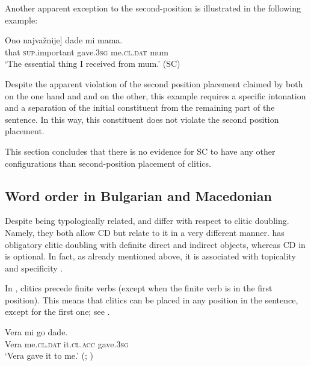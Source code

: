 \documentclass[output=paper,
colorlinks,
citecolor=brown,
newtxmath
]{langscibook}
\begin{document}
Another apparent exception to the second-position is illustrated in the following example:


\ea\label{ex:zivojinovic:23}
\gll\minsp{[} Ono najvažnije]    dade     mi        mama.       \\
    {} that \textsc{sup}.important gave.\textsc{3sg} me.\textsc{cl.dat} mum \\
\glt `The essential thing I received from mum.'
\hfill (SC)
\z

\noindent Despite the apparent violation of the second position placement claimed by both \citet{Franks.King2000} on the one hand and \citet{Boskovic2001} and \citet{Radanovic-Kocic1988} on the other, this example requires a specific intonation and a separation of the initial constituent from the remaining part of the sentence. In this way, this constituent does not violate the second position placement.

This section concludes that there is no evidence for SC to have any other configurations than second-position placement of clitics.

\subsection{Word order in Bulgarian and Macedonian}
\label{subsec:orderBM}
Despite being typologically related,  and  differ with respect to clitic doubling. Namely, they both allow CD but relate to it in a very different manner.  has obligatory clitic doubling with definite direct and indirect objects, whereas CD in  is optional. In fact, as already mentioned above, it is associated with topicality and specificity \citep{Sportiche1996,Cinque.Krapova2008}.

In , clitics precede finite verbs (except when the finite verb is in the first position). This means that clitics can be placed in any position in the sentence, except for the first one; see .


\ea\label{ex:zivojinovic:24}
\gll Vera mi        go         dade.           \\
     Vera me.\textsc{cl.dat} it.\textsc{cl.acc} gave.\textsc{3sg}\\
\glt `Vera gave it to me.'
\hfill (; \citealt[234]{Franks.King2000})
\z

\end{document}
